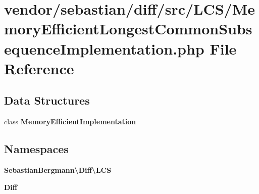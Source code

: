 \section{vendor/sebastian/diff/src/\+L\+C\+S/\+Memory\+Efficient\+Longest\+Common\+Subsequence\+Implementation.php File Reference}
\label{_memory_efficient_longest_common_subsequence_implementation_8php}
\subsection*{Data Structures}
\begin{DoxyCompactItemize}
\item 
class {\bf Memory\+Efficient\+Implementation}
\end{DoxyCompactItemize}
\subsection*{Namespaces}
\begin{DoxyCompactItemize}
\item 
 {\bf Sebastian\+Bergmann\textbackslash{}\+Diff\textbackslash{}\+L\+C\+S}
\item 
 {\bf Diff}
\end{DoxyCompactItemize}
